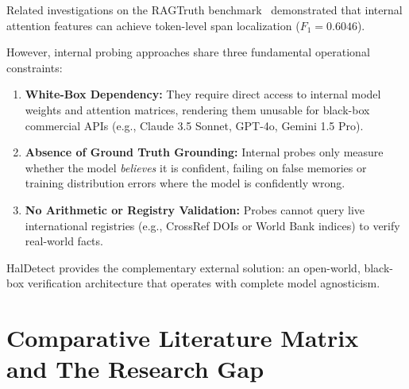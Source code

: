 Related investigations on the RAGTruth benchmark~\cite{niu2024ragtruth} demonstrated that internal attention features can achieve token-level span localization ($F_1 = 0.6046$).

However, internal probing approaches share three fundamental operational constraints:
\begin{enumerate}
    \item \textbf{White-Box Dependency:} They require direct access to internal model weights and attention matrices, rendering them unusable for black-box commercial APIs (e.g., Claude 3.5 Sonnet, GPT-4o, Gemini 1.5 Pro).
    \item \textbf{Absence of Ground Truth Grounding:} Internal probes only measure whether the model \textit{believes} it is confident, failing on false memories or training distribution errors where the model is confidently wrong.
    \item \textbf{No Arithmetic or Registry Validation:} Probes cannot query live international registries (e.g., CrossRef DOIs or World Bank indices) to verify real-world facts.
\end{enumerate}

HalDetect provides the complementary external solution: an open-world, black-box verification architecture that operates with complete model agnosticism.

\section{Comparative Literature Matrix and The Research Gap}
\label{sec:literature_matrix}

